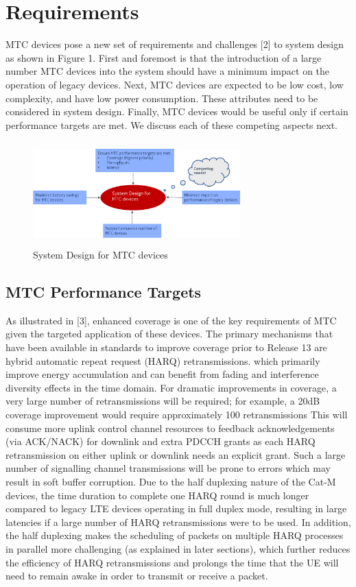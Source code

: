 \documentclass[conference,compsoc]{IEEEtran}
\begin{document}
\section{Requirements}
MTC devices pose a new set of requirements and challenges [2] to system design as shown in Figure 1. First and foremost is that the introduction of a large number MTC devices into the system should have a minimum impact on the operation of legacy devices. Next, MTC devices are expected to be low cost, low complexity, and have low power consumption. These attributes need to be considered in system design. Finally, MTC devices would be useful only if certain performance targets are met. We discuss each of these competing aspects next.

\begin{figure}[htbp]
\centerline{\includegraphics[height=40mm,width=80mm]{sys_design.png}}
\caption{System Design for MTC devices}
\label{fig_sys_design}
\end{figure}

\subsection{MTC Performance Targets}
As illustrated in [3], enhanced coverage is one of the key requirements of   MTC given the targeted application of these devices. The primary mechanisms that have been available in standards to improve coverage prior to Release 13 are hybrid automatic repeat request (HARQ) retransmissions. which primarily improve energy accumulation and can benefit from fading and interference diversity effects in the time domain.  For dramatic improvements in coverage, a very large number of retransmissions will be required; for example, a 20dB coverage improvement would require approximately 100 retransmissions This will consume more uplink control channel resources to feedback acknowledgements (via ACK/NACK) for downlink and extra PDCCH grants as each HARQ retransmission on either uplink or downlink needs an explicit grant. Such a large number of signalling channel transmissions will be prone to errors which may result in soft buffer corruption. Due to the half duplexing nature of the Cat-M devices, the time duration to complete one HARQ round is much longer compared to legacy LTE devices operating in full duplex mode, resulting in large latencies if a large number of HARQ retransmissions were to be used. In addition, the half duplexing makes the scheduling of packets on multiple HARQ processes in parallel more challenging (as explained in later sections), which further reduces the efficiency of HARQ retransmissions and prolongs the time that the UE will need to remain awake in order to transmit or receive a packet.  
\end{document}
